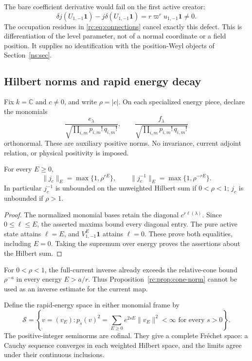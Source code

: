 The bare coefficient derivative would fail on the first
active creator:
\begin{equation}\label{rc:eq:bare-defect}
 \delta j(U_{1,-1}\mathbf1)-j\delta(U_{1,-1}\mathbf1)
      =r\varpi^r u_{1,-1}\mathbf1\ne0.
\end{equation}
The occupation residues in \eqref{rc:eq:connections}
cancel exactly this defect.  This is differentiation of the
level parameter, not of a normal coordinate or a field
position.  It supplies no identification with the
position-Weyl objects of Section~\ref{ns:sec}.

\subsection{Hilbert norms and rapid energy decay}

Fix \(k=\mathbb C\) and \(c\ne0\), and write \(\rho=|c|\).
On each specialized energy piece, declare the monomials
\[
 \frac{e_\lambda}
 {\sqrt{\prod_{i,m}p_{i,m}!\,q_{i,m}!}},
 \qquad
 \frac{f_\lambda}
 {\sqrt{\prod_{i,m}p_{i,m}!\,q_{i,m}!}}
\]
orthonormal.  These are auxiliary positive norms.  No
invariance, current adjoint relation, or physical positivity
is imposed.

\begin{proposition}\label{rc:prop:norms}
For every \(E\geq0\),
\begin{equation}\label{rc:eq:energy-norms}
 \|j_c\|_E=\max\{1,\rho^{rE}\},\qquad
 \|j_c^{-1}\|_E=\max\{1,\rho^{-rE}\}.
\end{equation}
In particular \(j_c^{-1}\) is unbounded on the unweighted
Hilbert sum if \(0<\rho<1\); \(j_c\) is unbounded if
\(\rho>1\).
\end{proposition}
\begin{proof}
The normalized monomial bases retain the diagonal
\(c^{r\ell(\lambda)}\).  Since \(0\leq\ell\leq E\),
the asserted maxima bound every diagonal entry.
The pure active state attains \(\ell=E\), and
\(V_{1,-1}^E\mathbf1\) attains \(\ell=0\).
These prove both equalities, including \(E=0\).
Taking the supremum over energy proves the assertions
about the Hilbert sum.
\end{proof}

For \(0<\rho<1\), the full-current inverse already exceeds
the relative-cone bound \(\rho^{-a}\) in every energy
\(E>a/r\).  Thus Proposition~\ref{rc:prop:cone-norm}
cannot be used as an inverse estimate for the current map.

Define the rapid-energy space in either monomial frame by
\begin{equation}\label{rc:eq:rapid-space}
 \mathscr S=
 \left\{v=(v_E):
 p_s(v)^2=\sum_{E\geq0}e^{2sE}\|v_E\|^2<\infty
                       \text{ for every }s>0\right\}.
\end{equation}
The positive-integer seminorms are cofinal.  They give a
complete Fr\'echet space: a Cauchy sequence converges in
each weighted Hilbert space, and the limits agree under
their continuous inclusions.

